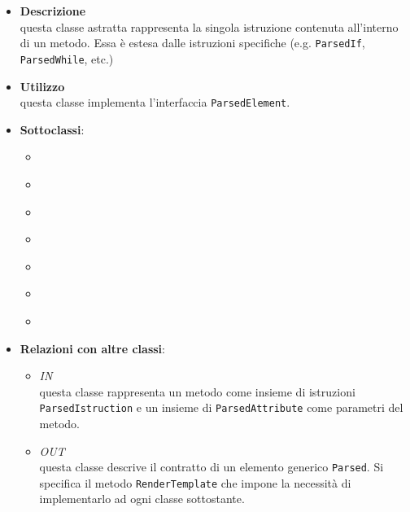 \label{\nogloxy{swedesigner::server::project::ParsedInstruction}}
\begin{itemize}
\item \textbf{Descrizione}\\
questa classe astratta rappresenta la singola istruzione contenuta all'interno di un metodo. Essa è estesa dalle istruzioni specifiche (e.g. \texttt{ParsedIf}, \texttt{ParsedWhile}, etc.)
\item \textbf{Utilizzo}\\
questa classe implementa l'interfaccia \texttt{ParsedElement}.
\item \textbf{Sottoclassi}:
\begin{itemize}
\item \hyperref[\nogloxy{swedesigner::server::project::ParsedAssignment}]{}
\item \hyperref[\nogloxy{swedesigner::server::project::ParsedCustom}]{}
\item \hyperref[\nogloxy{swedesigner::server::project::ParsedFor}]{}
\item \hyperref[\nogloxy{swedesigner::server::project::ParsedIf}]{}
\item \hyperref[\nogloxy{swedesigner::server::project::ParsedInitialize}]{}
\item \hyperref[\nogloxy{swedesigner::server::project::ParsedReturn}]{}
\item \hyperref[\nogloxy{swedesigner::server::project::ParsedWhile}]{}
\end{itemize}
\item \textbf{Relazioni con altre classi}:
\begin{itemize}
\item \textit{IN} \hyperref[\nogloxy{swedesigner::server::project::ParsedMethod}]{}\\
questa classe rappresenta un metodo come insieme di istruzioni \texttt{ParsedIstruction} e un insieme di \texttt{ParsedAttribute} come parametri del metodo.
\item \textit{OUT} \hyperref[\nogloxy{swedesigner::server::project::ParsedElement}]{}\\
questa classe descrive il contratto di un elemento generico \texttt{Parsed}. Si specifica il metodo \texttt{RenderTemplate} che impone la necessità di implementarlo ad ogni classe sottostante.
\end{itemize}
\end{itemize}

